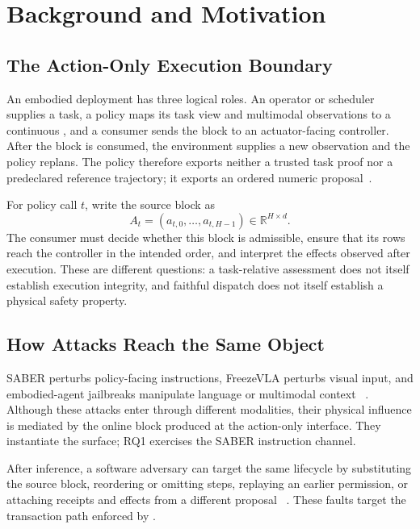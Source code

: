 \section{Background and Motivation}
\label{sec:background}

\subsection{The Action-Only Execution Boundary}

An embodied \vla deployment has three logical roles.  An operator or scheduler
supplies a task, a policy maps its task view and multimodal observations to a
continuous \actionblock, and a consumer sends the block to an actuator-facing
controller.  After the block is consumed, the environment supplies a new
observation and the policy replans.  The policy therefore exports neither a
trusted task proof nor a predeclared reference trajectory; it exports an ordered
numeric proposal~\cite{pi05}.

For policy call $t$, write the source block as
\begin{equation}
A_t=(a_{t,0},\ldots,a_{t,H-1})\in\mathbb{R}^{H\times d}.
\label{eq:action-block-background}
\end{equation}
The consumer must decide whether this block is admissible, ensure that its rows
reach the controller in the intended order, and interpret the effects observed
after execution.  These are different questions: a task-relative assessment
does not itself establish execution integrity, and faithful dispatch does not
itself establish a physical safety property.

\subsection{How Attacks Reach the Same Object}

SABER perturbs policy-facing instructions, FreezeVLA perturbs visual input, and
embodied-agent jailbreaks manipulate language or multimodal context
~\cite{saber2026,freezevla2025,badrobot2025,robopair2025}.  Although these attacks
enter through different modalities, their physical influence is mediated by the
online block produced at the action-only interface.  They instantiate the
\intentaction surface; RQ1 exercises the SABER instruction channel.

After inference, a software
adversary can target the same lifecycle by substituting the source block,
reordering or omitting steps, replaying an earlier permission, or attaching
receipts and effects from a different proposal
~\cite{diat2019,cfaplus2024,arto2026,tat2026}.  These faults target the
\actionexecution transaction path enforced by \ltwoa.


